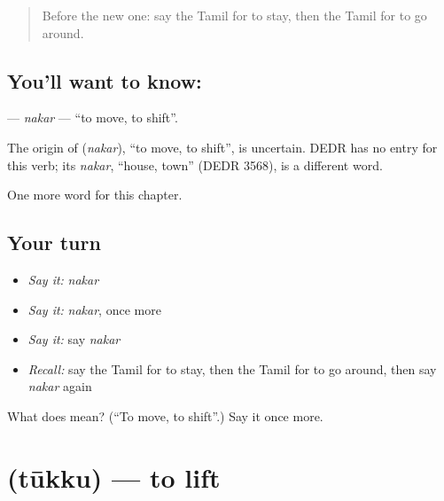 \label{lesson:TA-C162-nakar}



\begin{quote}
Before the new one: say the Tamil for to stay, then the Tamil for to go around.
\end{quote}

\subsection*{You'll want to know: }
\textbf{} — \emph{nakar} — \textquotedblleft{}to move, to shift\textquotedblright{}.

\begin{cousinweb}
The origin of \textbf{} (\emph{nakar}), \textquotedblleft{}to move, to shift\textquotedblright{}, is uncertain. DEDR has no entry for this verb; its \emph{nakar}, \textquotedblleft{}house, town\textquotedblright{} (DEDR 3568), is a different word.
\end{cousinweb}

\begin{grammarlens}[title={What you've built}]
One more word for this chapter.
\end{grammarlens}

\subsection*{Your turn}
\begin{itemize}
\raggedright
  \item \emph{Say it:} \emph{nakar}
  \item \emph{Say it:} \emph{nakar}, once more
  \item \emph{Say it:} say \emph{nakar}
  \item \emph{Recall:} say the Tamil for to stay, then the Tamil for to go around, then say \emph{nakar} again
\end{itemize}

\begin{tcolorbox}[breakable,colback=teal!4,colframe=teal!35!black,title={Before you move on}]
What does  mean? (\textquotedblleft{}To move, to shift\textquotedblright{}.) Say it once more.
\end{tcolorbox}
\section[\texorpdfstring{\ta{தூக்கு} (tūkku)}{தூக்கு (tūkku)}]{ (tūkku) — to lift}

